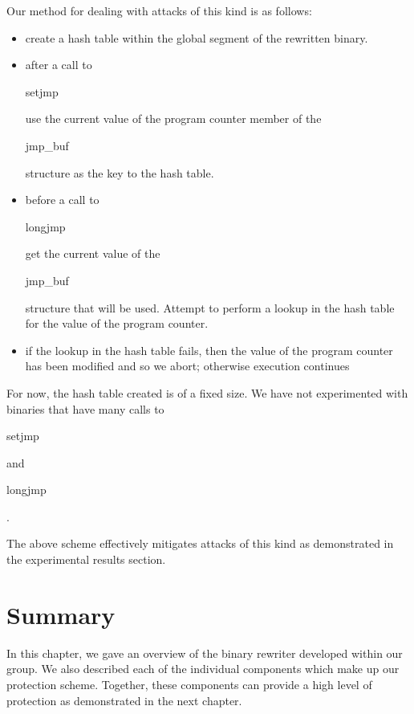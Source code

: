 Our method for dealing with attacks of this kind is as follows:

\begin{itemize}

 \item create a hash table within the global segment of the rewritten binary.
 \item after a call to \begin{em}setjmp\end{em} use the current value of the program counter member
 of the \begin{em}jmp\_buf\end{em} structure as the key to the hash table.
 \item before a call to \begin{em}longjmp\end{em} get the current value of the
 \begin{em}jmp\_buf\end{em} structure that will be used. Attempt to perform a lookup in the hash
 table for the value of the program counter.
 \item if the lookup in the hash table fails, then the value of the program counter has been
 modified and so we abort; otherwise execution continues

\end{itemize}

For now, the hash table created is of a fixed size. We have not experimented with binaries that have
many calls to \begin{em}setjmp\end{em} and \begin{em}longjmp\end{em}. 

The above scheme effectively mitigates attacks of this kind as demonstrated in the experimental
results section.

\section{Summary}

In this chapter, we gave an overview of the binary rewriter developed within our group. We also
described each of the individual components which make up our protection scheme. Together, these
components can provide a high level of protection as demonstrated in the next chapter.
